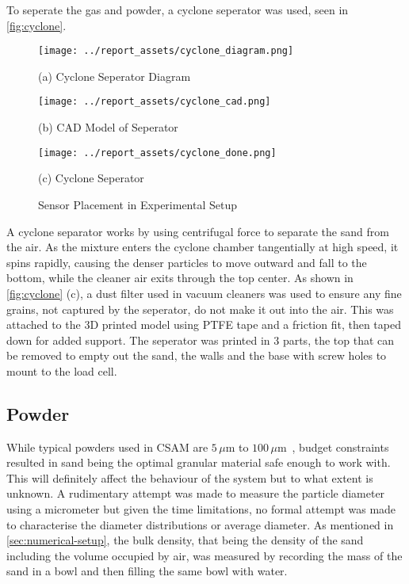 To seperate the gas and powder, a cyclone seperator was used, seen in \autoref{fig:cyclone}.
\begin{figure}[htbp]
    \centering

    \begin{minipage}{0.3\textwidth}
        \centering
        \texttt{[image: ../report\_assets/cyclone\_diagram.png]}
        \caption*{(a) Cyclone Seperator Diagram}
    \end{minipage}
    \hfill
    \begin{minipage}{0.3\textwidth}
        \centering
        \texttt{[image: ../report\_assets/cyclone\_cad.png]}
        \caption*{(b) CAD Model of Seperator}
    \end{minipage}
    \hfill
    \begin{minipage}{0.3\textwidth}
        \centering
        \texttt{[image: ../report\_assets/cyclone\_done.png]}
        \caption*{(c) Cyclone Seperator}
    \end{minipage}
    \caption{Sensor Placement in Experimental Setup}\label{fig:cyclone}
\end{figure}
A cyclone separator works by using centrifugal force to separate the sand from the air. As the mixture enters the cyclone chamber tangentially at high speed, it spins rapidly, causing the denser particles to move outward and fall to the bottom, while the cleaner air exits through the top center. As shown in \autoref{fig:cyclone} (c), a dust filter used in vacuum cleaners was used to ensure any fine grains, not captured by the seperator, do not make it out into the air. This was attached to the 3D printed model using PTFE tape and a friction fit, then taped down for added support. The seperator was printed in 3 parts, the top that can be removed to empty out the sand, the walls and the base with screw holes to mount to the load cell.

\subsection{Powder}
While typical powders used in CSAM are $5\,\mu\mathrm{m}$ to $100\,\mu\mathrm{m}$~\cite{Vaz2023}, budget constraints resulted in sand being the optimal granular material safe enough to work with. This will definitely affect the behaviour of the system but to what extent is unknown. A rudimentary attempt was made to measure the particle diameter using a micrometer but given the time limitations, no formal attempt was made to characterise the diameter distributions or average diameter. As mentioned in \autoref{sec:numerical-setup}, the bulk density, that being the density of the sand including the volume occupied by air, was measured by recording the mass of the sand in a bowl and then filling the same bowl with water.

